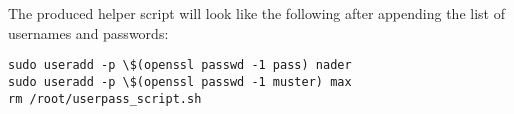 The produced helper script will look like the following after appending the list of usernames and passwords:

\begin{lstlisting}[caption=userpass\_script.sh, style=pythonstyle]
sudo useradd -p \$(openssl passwd -1 pass) nader
sudo useradd -p \$(openssl passwd -1 muster) max
rm /root/userpass_script.sh
\end{lstlisting}

